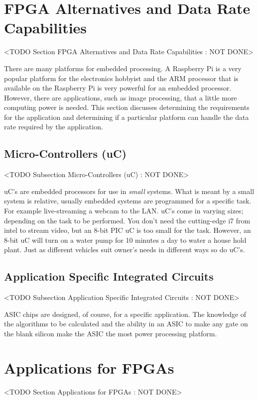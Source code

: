 \section{FPGA Alternatives and Data Rate Capabilities}
	<TODO Section FPGA Alternatives and Data Rate Capabilities : NOT DONE>

There are many platforms for embedded processing. A Raspberry Pi is a very popular platform for the electronics hobbyist and the ARM processor that is available on the Raspberry Pi is very powerful for an embedded processor. However, there are applications, such as image processing, that a little more computing power is needed. This section discusses determining the requirements for the application and determining if a particular platform can handle the data rate required by the application. 

\subsection{Micro-Controllers (uC)}
	<TODO Subsection Micro-Controllers (uC) : NOT DONE>

\ac{uC}'s are embedded processors for use in \emph{small} systems. What is meant by a small system is relative, usually embedded systems are programmed for a specific task. For example live-streaming a webcam to the \ac{LAN}. \ac{uC}'s come in varying sizes; depending on the task to be performed. You don't need the cutting-edge i7 from intel to stream video, but an 8-bit \ac{PIC} \ac{uC} is too small for the task. However, an 8-bit \ac{uC} will turn on a water pump for 10 minutes a day to water a house hold plant. Just as different vehicles suit owner's needs in different ways so do \ac{uC}'s.

\subsection{Application Specific Integrated Circuits}
	<TODO Subsection Application Specific Integrated Circuits : NOT DONE>

\ac{ASIC} chips are designed, of course, for a specific application. The knowledge of the algorithms to be calculated and the ability in an \ac{ASIC} to make any gate on the blank silicon make the \ac{ASIC} the most power processing platform. 

\section{Applications for FPGAs}
	<TODO Section Applications for FPGAs : NOT DONE>

